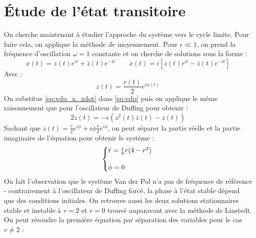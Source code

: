 \section{Étude de l'état transitoire}
%

%
On cherche maintenant à étudier
l'approche du système vers le cycle limite. Pour faire cela, on applique la méthode de moyennement. Pour $\epsilon \ll 1$, on prend
la fréquence d'oscillation $\omega = 1$ constante et on cherche de solutions sous la forme :
\begin{equation}
    x(t) = z(t)e^{it} + \bar{z}(t)e^{-it}
    \qquad
    \dot{x}(t) = i\left[ z(t)r^{it} - \bar{z}(t)e^{-it} \right]
    \label{eq:vdp_x_xdot}
\end{equation}
%
Avec :
%
\begin{equation}
    z(t) = \frac{r(t)}{2}e^{i\phi(t)}
\end{equation}
%
On substitue \eqref{eq:vdp_x_xdot} dans \eqref{eq:vdp} puis on applique le même raisonnement
que pour l'oscillateur de Duffing pour obtenir :
%
\begin{equation}
    2\dot{z}(t) =
    - \epsilon \left( z^2(t)\bar{z}(t) - z(t) \right)
\end{equation}
%
Sachant que $\dot{z}(t) = \frac{\dot{r}}{2}e^{i\phi} + i\dot{\phi}\frac{r}{2}e^{i\phi}$, on peut séparer la partie réelle et la partie imaginaire de l'équation pour obtenir le système :
\begin{equation}
    \left\{
    \begin{array}{@{}l@{}}
        \dot{r} = \frac{\epsilon}{8}r(4-r^2) \\
        \\
        \dot{\phi} = 0
    \end{array}
    \right.\,
\end{equation}
%
On fait l'observation que le système Van der Pol n'a pas de fréquence de référence - contrairement à l'oscillateur de Duffing forcé, la phase à l'état stable dépend que des conditions initiales.
On retrouve aussi les deux solutions stationnaires stable et instable à $r=2$ et $r=0$ trouvé auparavant avec la méthode de Linstedt. On peut résoudre la première équation par séparation des variables pour le cas $r \neq 2$ :
